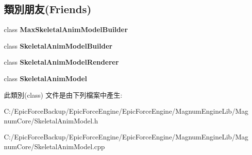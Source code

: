 \subsection*{類別朋友(Friends)}
\begin{DoxyCompactItemize}
\item 
class {\bfseries Max\+Skeletal\+Anim\+Model\+Builder}\hypertarget{class_magnum_1_1_skeletal_anim_model_1_1_bone_a68b08defd5651552ef2b6f922eee7ff9}{}\label{class_magnum_1_1_skeletal_anim_model_1_1_bone_a68b08defd5651552ef2b6f922eee7ff9}

\item 
class {\bfseries Skeletal\+Anim\+Model\+Builder}\hypertarget{class_magnum_1_1_skeletal_anim_model_1_1_bone_a31d58261bc4fbf7a6c1d2d2547437974}{}\label{class_magnum_1_1_skeletal_anim_model_1_1_bone_a31d58261bc4fbf7a6c1d2d2547437974}

\item 
class {\bfseries Skeletal\+Anim\+Model\+Renderer}\hypertarget{class_magnum_1_1_skeletal_anim_model_1_1_bone_ae50fe2cd824b9de98af4dd4aa51d4935}{}\label{class_magnum_1_1_skeletal_anim_model_1_1_bone_ae50fe2cd824b9de98af4dd4aa51d4935}

\item 
class {\bfseries Skeletal\+Anim\+Model}\hypertarget{class_magnum_1_1_skeletal_anim_model_1_1_bone_a88c72f2f6b125ba518843b71080035e5}{}\label{class_magnum_1_1_skeletal_anim_model_1_1_bone_a88c72f2f6b125ba518843b71080035e5}

\end{DoxyCompactItemize}


此類別(class) 文件是由下列檔案中產生\+:\begin{DoxyCompactItemize}
\item 
C\+:/\+Epic\+Force\+Backup/\+Epic\+Force\+Engine/\+Epic\+Force\+Engine/\+Magnum\+Engine\+Lib/\+Magnum\+Core/Skeletal\+Anim\+Model.\+h\item 
C\+:/\+Epic\+Force\+Backup/\+Epic\+Force\+Engine/\+Epic\+Force\+Engine/\+Magnum\+Engine\+Lib/\+Magnum\+Core/Skeletal\+Anim\+Model.\+cpp\end{DoxyCompactItemize}
